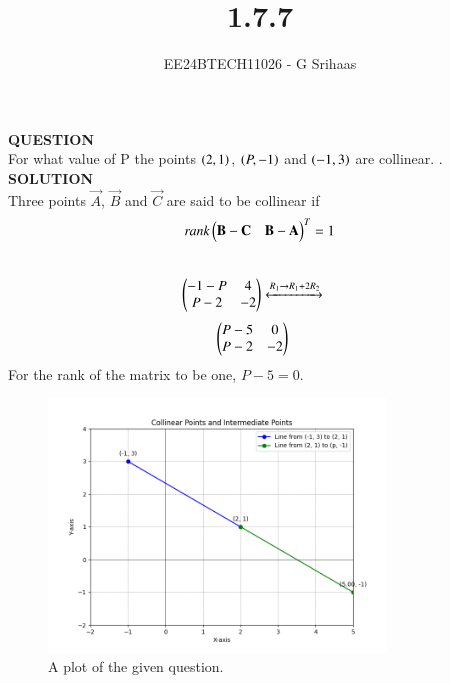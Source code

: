 \documentclass[journal]{IEEEtran}
\begin{document}

\vspace{3cm}

\title{1.7.7}
\author{EE24BTECH11026 - G Srihaas}
{\let\newpage\relax\maketitle}

\renewcommand{\thefigure}{\theenumi}
\renewcommand{\thetable}{\theenumi}
\setlength{\intextsep}{10pt} %


\renewcommand{\thetable}{\theenumi}

\textbf{QUESTION} \\
For what value of P  the points $\left(2,1\right)$, $\left(P,-1\right)$ and $\left(-1,3\right)$ are collinear. \hfill{}.\\
\textbf{SOLUTION} \\
 

Three points $\vec{A}$, $\vec{B}$ and $\vec{C}$ are said to be collinear if $$\emph{rank}\begin{pmatrix}\mathbf{B}-\mathbf{C} & \mathbf{B} - \mathbf{A}\end{pmatrix}^T = 1 $$ \\
\begin{align}
\begin{pmatrix} -1-P & 4 \\
         P-2 & -2 \end{pmatrix} 
\xleftrightarrow[]{R_1 \rightarrow {R_1+2R_2}}\quad
\end{align}
\begin{align}
\begin{pmatrix} P-5 & 0 \\
        P-2 & -2 \end{pmatrix}\quad
\end{align}
For the rank of the matrix to be one, $P-5=0$.

\begin{figure}[ht]
	\centering
	\includegraphics[width=0.8\textwidth]{figs/fig.png}
	\caption{A plot of the given question.}
	\label{fig:Plot1}
\end{figure}

	
\end{document}
